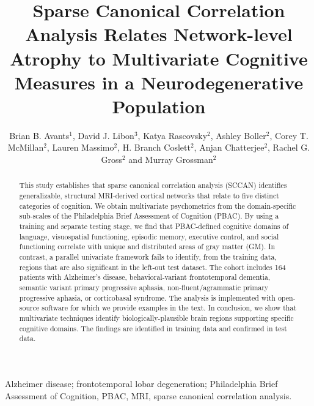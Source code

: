 \documentclass[preprint,authoryear,12pt]{elsarticle}
\begin{document}
\title{Sparse Canonical Correlation Analysis Relates Network-level Atrophy 
to Multivariate Cognitive Measures in a Neurodegenerative Population}
\author{Brian B. Avants$^1$, David J. Libon$^3$, Katya Rascovsky$^2$, Ashley Boller$^2$, Corey T. McMillan$^2$, Lauren Massimo$^2$, H. Branch Coslett$^2$, Anjan Chatterjee$^2$, Rachel G. Gross$^2$ and Murray Grossman$^2$}
\address{Departments of Radiology$^1$ and Neurology$^2$, University of Pennsylvania School of Medicine, Philadelphia, PA}
\address{Department of Neurology$^3$, Drexel University College of Medicine, Philadelphia, PA.}
\begin{abstract}
This study establishes that sparse canonical correlation analysis (SCCAN) identifies generalizable, structural MRI-derived cortical networks that relate to five distinct categories of cognition.  We obtain multivariate psychometrics from the domain-specific sub-scales of the Philadelphia Brief Assessment of Cognition (PBAC).  By using a training and separate testing stage, we find that PBAC-defined cognitive domains of language, visuospatial functioning, episodic memory, executive control, and social functioning correlate with unique and distributed areas of gray matter (GM).  In contrast, a parallel univariate framework fails to identify, from the training data, regions that are also significant in the left-out test dataset. The cohort includes 164 patients with Alzheimer's disease, behavioral-variant frontotemporal dementia, semantic variant primary progressive aphasia, non-fluent/agrammatic primary progressive aphasia, or corticobasal syndrome.  The analysis is implemented with open-source software for which we provide examples in the text.  In conclusion, we show that multivariate techniques identify biologically-plausible brain regions supporting specific cognitive domains.  The findings are identified in training data and confirmed in test data. 
\end{abstract}
\begin{keyword}
Alzheimer disease; frontotemporal lobar degeneration; Philadelphia Brief Assessment of Cognition, PBAC, MRI, sparse canonical correlation analysis.
\end{keyword}
\maketitle

\end{document}
